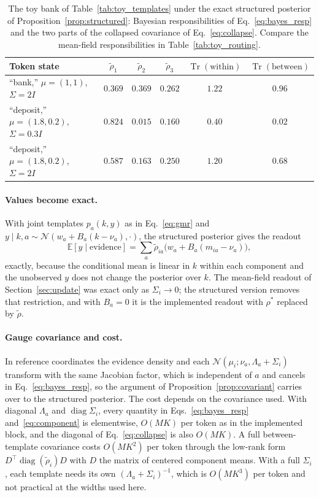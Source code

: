 \documentclass[11pt]{article}
\theoremstyle{definition}
\theoremstyle{remark}
\newcommand{\Tr}{\operatorname{Tr}}
\newcommand{\diag}{\operatorname{diag}}
\newcommand{\E}{\mathbb{E}}
\newcommand{\N}{\mathcal{N}}
\begin{document}
\begin{table}[h]
\centering
\begin{tabular}{@{}lccccc@{}}
\toprule
Token state & $\tilde\rho_{1}$ & $\tilde\rho_{2}$ & $\tilde\rho_{3}$ & $\Tr(\text{within})$ & $\Tr(\text{between})$ \\
\midrule
``bank,'' $\mu=(1,1)$, $\Sigma=2I$ & $0.369$ & $0.369$ & $0.262$ & $1.22$ & $0.96$ \\
``deposit,'' $\mu=(1.8,0.2)$, $\Sigma=0.3I$ & $0.824$ & $0.015$ & $0.160$ & $0.40$ & $0.02$ \\
``deposit,'' $\mu=(1.8,0.2)$, $\Sigma=2I$ & $0.587$ & $0.163$ & $0.250$ & $1.20$ & $0.68$ \\
\bottomrule
\end{tabular}
\caption{The toy bank of Table~\ref{tab:toy_templates} under the exact structured posterior of Proposition~\ref{prop:structured}: Bayesian responsibilities of Eq.~\eqref{eq:bayes_resp} and the two parts of the collapsed covariance of Eq.~\eqref{eq:collapse}. Compare the mean-field responsibilities in Table~\ref{tab:toy_routing}.}
\label{tab:structured}
\end{table}

\paragraph{Values become exact.}
With joint templates $p_a(k,y)$ as in Eq.~\eqref{eq:gmr} and $y\mid k,a\sim\N(w_a+B_a(k-\nu_a),\cdot)$, the structured posterior gives the readout
\begin{equation}
\E[y\mid\text{evidence}]=\sum_a\tilde\rho_{ia}\bigl(w_a+B_a(m_{ia}-\nu_a)\bigr),
\label{eq:structured_readout}
\end{equation}
exactly, because the conditional mean is linear in $k$ within each component and the unobserved $y$ does not change the posterior over $k$. The mean-field readout of Section~\ref{sec:update} was exact only as $\Sigma_i\to0$; the structured version removes that restriction, and with $B_a=0$ it is the implemented readout with $\rho^{*}$ replaced by $\tilde\rho$.

\paragraph{Gauge covariance and cost.}
In reference coordinates the evidence density and each $\N(\mu_i;\nu_a,\Lambda_a+\Sigma_i)$ transform with the same Jacobian factor, which is independent of $a$ and cancels in Eq.~\eqref{eq:bayes_resp}, so the argument of Proposition~\ref{prop:covariant} carries over to the structured posterior. The cost depends on the covariance used. With diagonal $\Lambda_a$ and $\diag\Sigma_i$, every quantity in Eqs.~\eqref{eq:bayes_resp} and~\eqref{eq:component} is elementwise, $O(MK)$ per token as in the implemented block, and the diagonal of Eq.~\eqref{eq:collapse} is also $O(MK)$. A full between-template covariance costs $O(MK^2)$ per token through the low-rank form $D^{\top}\diag(\tilde\rho_i)D$ with $D$ the matrix of centered component means. With a full $\Sigma_i$, each template needs its own $(\Lambda_a+\Sigma_i)^{-1}$, which is $O(MK^3)$ per token and not practical at the widths used here.
\end{document}
